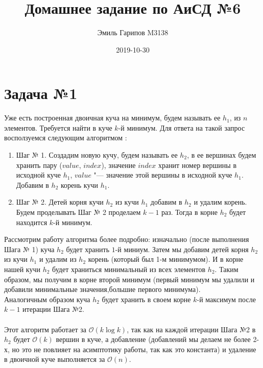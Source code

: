 \documentclass{article}
\title{Домашнее задание по АиСД №6}
\date{2019-10-30}
\author{Эмиль Гарипов M3138}
\begin{document}

\maketitle
\newpage
{}

\section*{Задача №1}
Уже есть построенная двоичная куча на минимум, будем называть ее $h_1$, из $n$ элементов. Требуется найти в куче $k$-й минимум. Для ответа на такой запрос восползуемся следующим алгоритмом :
\begin{enumerate}
	\item[] Шаг № 1. Создадим новую кучу, будем называть ее $h_2$, в ее вершинах будем хранить пару ($value$, $index$), значение $index$ хранит номер вершины в исходной куче $h_1$, $value$ "--- значение этой вершины в исходной куче $h_1$. Добавим в $h_2$ корень кучи $h_1$.
	\item[] Шаг № 2. Детей корня кучи $h_2$ из кучи $h_1$ добавим в $h_2$ и удалим корень. Будем проделывать Шаг № 2 проделаем $k - 1$ раз. Тогда в корне $h_2$ будет находится $k$-й минимум.
\end{enumerate}
Рассмотрим работу алгоритма более подробно: изначально (после выполнения Шага № 1) куча $h_2$ будет хранить $1$-й миниум. Затем мы добавим детей корня $h_2$ из кучи $h_1$ и удалим из $h_2$ корень (который был 1-м минимумом). И в корне нашей кучи $h_2$ будет храниться минимальный из всех элементов $h_2$. Таким образом, мы получим в корне второй минимум (первый минимум мы удалили и добавили минимальные значения,большие первого минимума). 
\\
Аналогичным образом куча $h_2$ будет хранить в своем корне $k$-й максимум после $k - 1$ итерации Шага №2.
\\\\
Этот алгоритм работает за $\mathcal{O}(k\log{k})$, так как на каждой итерации Шага №2 в $h_2$ будет $\mathcal{O}(k)$ вершин в куче, а добавление (добавлений мы делаем не более 2-х, но это не повлияет на асимптотику работы, так как это константа) и удаление в двоичной куче выполняется за $\mathcal{O}(n)$.
\end{document}
